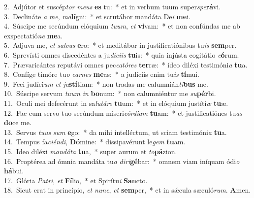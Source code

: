 {2.~}Adjútor et suscép\textit{tor} \textit{me}\textit{us} \textbf{es} tu:~* et in verbum tuum super\textit{spe}\textbf{rá}vi.\\
{3.~}Declináte \textit{a} \textit{me}, \textit{ma}\textbf{lí}gni:~* et scrutábor mandáta De\textit{i} \textbf{me}i.\\
{4.~}Súscipe me secúndum elóquium \textit{tu}\textit{um}, \textit{et} \textbf{vi}vam:~* et non confúndas me ab exspectatió\textit{ne} \textbf{me}a.\\
{5.~}Adjuva me, \textit{et} \textit{sal}\textit{vus} \textbf{e}ro:~* et meditábor in justificatiónibus tu\textit{is} \textbf{sem}per.\\
{6.~}Sprevísti omnes discedéntes a ju\textit{dí}\textit{ci}\textit{is} \textbf{tu}is:~* quia injústa cogitátio \textit{e}\textbf{ó}rum.\\
{7.~}Prævaricántes reputávi omnes pec\textit{ca}\textit{tó}\textit{res} \textbf{ter}ræ:~* ídeo diléxi testimóni\textit{a} \textbf{tu}a.\\
{8.~}Confíge timóre tu\textit{o} \textit{car}\textit{nes} \textbf{me}as:~* a judíciis enim tu\textit{is} \textbf{tí}mui.\\
{9.~}Feci judíci\textit{um} \textit{et} \textit{ju}\textbf{stí}tiam:~* non tradas me calumnián\textit{ti}\textbf{bus} me.\\
{10.~}Súscipe servum \textit{tu}\textit{um} \textit{in} \textbf{bo}num:~* non calumniéntur me \textit{su}\textbf{pér}bi.\\
{11.~}Oculi mei defecérunt in sa\textit{lu}\textit{tá}\textit{re} \textbf{tu}um:~* et in elóquium justíti\textit{æ} \textbf{tu}æ.\\
{12.~}Fac cum servo tuo secúndum miseri\textit{cór}\textit{di}\textit{am} \textbf{tu}am:~* et justificatiónes tu\textit{as} \textbf{do}ce me.\\
{13.~}Servus \textit{tu}\textit{us} \textit{sum} \textbf{e}go:~* da mihi intelléctum, ut sciam testimóni\textit{a} \textbf{tu}a.\\
{14.~}Tempus fa\textit{ci}\textit{én}\textit{di}, \textbf{Dó}mine:~* dissipavérunt le\textit{gem} \textbf{tu}am.\\
{15.~}Ideo diléxi \textit{man}\textit{dá}\textit{ta} \textbf{tu}a,~* super aurum et \textit{to}\textbf{pá}zion.\\
{16.~}Proptérea ad ómnia mandáta tu\textit{a} \textit{di}\textit{ri}\textbf{gé}bar:~* omnem viam iníquam ódi\textit{o} \textbf{há}bui.\\
{17.~}Glória \textit{Pa}\textit{tri}, \textit{et} \textbf{Fí}lio,~* et Spirítu\textit{i} \textbf{San}cto.\\
{18.~}Sicut erat in princípio, \textit{et} \textit{nunc}, \textit{et} \textbf{sem}per,~* et in sǽcula sæculó\textit{rum}. \textbf{A}men.\\
